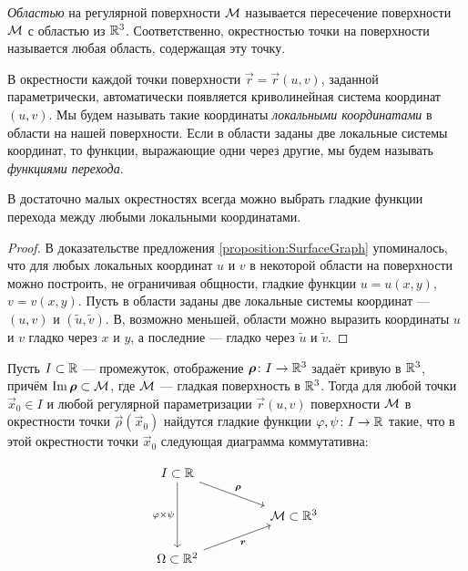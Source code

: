\begin{definition}
	\textit{Областью} на регулярной поверхности $\mathcal{M}$ называется пересечение поверхности $\mathcal{M}$ с областью из $\mathbb{R}^3$. Соответственно, окрестностью точки на поверхности называется любая область, содержащая эту точку.
\end{definition}

В окрестности каждой точки поверхности $\vec{r} = \vec{r}(u, v)$, заданной параметрически, автоматически появляется криволинейная система координат $(u, v)$. Мы будем называть такие координаты \textit{локальными координатами} в области на нашей поверхности. Если в области заданы две локальные системы координат, то функции, выражающие одни через другие, мы будем называть \textit{функциями перехода}.

\begin{lemma} \label{lemma:SmoothLocal}
	В достаточно малых окрестностях всегда можно выбрать гладкие функции перехода между любыми локальными координатами.
\end{lemma}

\begin{proof}
	В доказательстве предложения \ref{proposition:SurfaceGraph} упоминалось, что для любых локальных координат $u$ и $v$ в некоторой области на поверхности можно построить, не ограничивая общности, гладкие функции $u = u(x, y)$, $v = v(x, y)$. Пусть в области заданы две локальные системы координат --- $(u, v)$ и $(\widetilde{u}, \widetilde{v})$. В, возможно меньшей, области можно выразить координаты $u$ и $v$ гладко через $x$ и $y$, а последние --- гладко через $\widetilde{u}$ и $\widetilde{v}$.
\end{proof}

\begin{corollary}
	Пусть $I \subset \mathbb{R}$ --- промежуток, отображение $\boldsymbol{\rho}\colon I \to \mathbb{R}^3$ задаёт кривую в $\mathbb{R}^3$, причём $\operatorname{Im}\boldsymbol{\rho} \subset \mathcal{M}$, где $\mathcal{M}$ --- гладкая поверхность в $\mathbb{R}^3$. Тогда для любой точки $\vec{x}_0 \in I$ и любой регулярной параметризации $\vec{r}(u, v)$ поверхности $\mathcal{M}$ в окрестности точки $\vec{\rho}(\vec{x}_0)$ найдутся гладкие функции $\varphi, \psi\colon I \to \mathbb{R}$ такие, что в этой окрестности точки $\vec{x}_0$ следующая диаграмма коммутативна:

	\[\begin{tikzcd}
			{I \subset \R} \\
			&& {\mathcal{M} \subset\R^3} \\
			{\Omega \subset \R^2}
			\arrow["\vec{\rho}", from=1-1, to=2-3]
			\arrow["{\varphi \times \psi}"', from=1-1, to=3-1]
			\arrow["{\boldsymbol{r}}"', from=3-1, to=2-3]
	\end{tikzcd}\]
\end{corollary}

